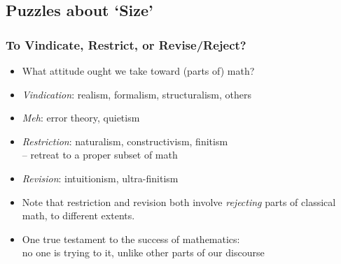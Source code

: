 

\subsection{Puzzles about `Size'}


\begin{frame}
\frametitle{To Vindicate, Restrict, or Revise/Reject?}

\begin{itemize}[<+->]

\item What attitude ought we take toward (parts of) math?

\item \emph{Vindication}: realism, formalism, structuralism, others

\item \emph{Meh}: error theory, quietism

\item \emph{Restriction}: naturalism, constructivism, finitism \\ -- retreat to a proper subset of math

\item \emph{Revision}: intuitionism, ultra-finitism

\item Note that restriction and revision both involve \textit{rejecting} parts of classical math, to different extents. 


\item One true testament to the success of mathematics: \\ no one is trying to  it, unlike other parts of our discourse 



\end{itemize}
\end{frame}


